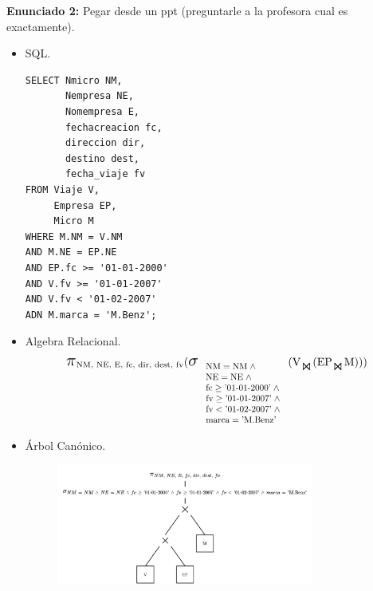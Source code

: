\documentclass{templateNote}
\begin{document}
\textbf{Enunciado 2:}\newline
Pegar desde un ppt (preguntarle a la profesora cual es exactamente).
\begin{itemize}
    \item SQL.
    \begin{verbatim}
SELECT Nmicro NM,
       Nempresa NE,
       Nomempresa E,
       fechacreacion fc,
       direccion dir,
       destino dest,
       fecha_viaje fv
FROM Viaje V,
     Empresa EP,
     Micro M
WHERE M.NM = V.NM
AND M.NE = EP.NE
AND EP.fc >= '01-01-2000'
AND V.fv >= '01-01-2007'
AND V.fv < '01-02-2007'
ADN M.marca = 'M.Benz';
    \end{verbatim}

    \item Algebra Relacional.
    \begin{align*}
        \scalebox{1.5}{$\pi$}_{\text{NM, NE, E, fc, dir, dest, fv}} (
            \scalebox{1.5}{$\sigma$}_{
                \scalebox{0.8}{
                    $\begin{array}{l}
                        \text{NM} = \text{NM} \; \wedge \\
                        \text{NE} = \text{NE} \; \wedge \\
                        \text{fc} \geq \text{'01-01-2000'} \; \wedge \\
                        \text{fv} \geq \text{'01-01-2007'} \; \wedge \\
                        \text{fv} < \text{'01-02-2007'} \; \wedge  \\
                        \text{marca} = \text{'M.Benz'}
                    \end{array}$
                }
            } (
                \text{V}_{\scalebox{1.3}{$\Join$}} (
                    \text{EP}_{\scalebox{1.3}{$\Join$}} \text{M}
                )
            )
        )
    \end{align*}

    \item \'Arbol Can\'onico.
    \begin{figure}[H]
        \centering
        \includegraphics[width=0.8\textwidth]{img/E6-Canonico.png}
    \end{figure}


\end{itemize}
\end{document}
